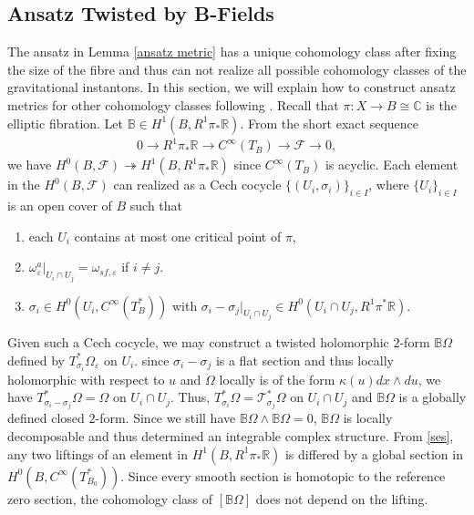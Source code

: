 \documentclass[11pt]{amsart}
\theoremstyle{plain}
\theoremstyle{definition}
\numberwithin{equation}{section}
\newcommand{\T}{\mathcal{T}}
\renewcommand{\epsilon}{\varepsilon}
\begin{document}
\subsection{Ansatz Twisted by B-Fields} \label{sec: B-field}
The ansatz in Lemma \ref{ansatz metric} has a unique cohomology class after fixing the size of the fibre and thus can not realize all possible cohomology classes of the gravitational instantons. In this section, we will explain how to construct ansatz metrics for other cohomology classes following \cite[Theorem 4.5]{GW}. Recall that $\pi:X\rightarrow B\cong \mathbb{C}$ is the elliptic fibration.  Let $\mathbb{B}\in H^1(B,R^1\pi_*\mathbb{R})$. From the short exact sequence 
  \begin{align} \label{ses}
  	 0\rightarrow R^1\pi_*\mathbb{R} \rightarrow  C^{\infty}(T_{B})\rightarrow  \mathcal{F}\rightarrow 0,
  \end{align} we have $H^0(B,\mathcal{F})\twoheadrightarrow H^1(B,R^1\pi_*\mathbb{R})$ since $C^{\infty}(T_{B})$ is acyclic. Each element in the $H^0(B,\mathcal{F})$ can realized as a Cech cocycle $\{(U_i,\sigma_i)\}_{i\in I}$, where $\{U_i\}_{i\in I} $ is an open cover of $B$ such that 
\begin{enumerate}
	\item each $U_i$ contains at most one critical point of $\pi$,
	\item $\omega^a_{\epsilon}|_{U_i\cap U_j}=\omega_{sf,\epsilon}$ if $i\neq j$.
	\item $\sigma_i\in H^0(U_i,C^{\infty}(T^*_B))$ with $\sigma_i-\sigma_j|_{U_i\cap U_j}\in H^0(U_i\cap U_j, R^1\pi^*\mathbb{R})$. 
\end{enumerate} 
Given such a Cech cocycle, we may construct a twisted holomorphic $2$-form $\mathbb{B}\Omega$ defined by $T_{\sigma_i}^*\Omega_{\epsilon}$ on $U_i$.
since $\sigma_i-\sigma_j$ is a flat section and thus locally holomorphic with respect to $u$ and $\Omega$ locally is of the form $\kappa(u)dx\wedge du$, we have $T_{\sigma_i-\sigma_j}^*\Omega=\Omega$ on $U_i\cap U_j$. Thus, $T_{\sigma_i}^*\Omega=\T_{\sigma_j}^*\Omega$ on $U_i\cap U_j$ and $\mathbb{B}\Omega$ is a globally defined closed $2$-form. Since we still have $\mathbb{B}\Omega\wedge \mathbb{B}\Omega=0$, $\mathbb{B}\Omega$ is locally decomposable and thus determined an integrable complex structure. From \eqref{ses}, any two liftings of an element in $H^1(B,R^1\pi_*\mathbb{R})$ is differed by a global section in $H^0(B,C^{\infty}(T_{B_0}^*))$. Since every smooth section is homotopic to the reference zero section, the cohomology class of $[\mathbb{B}\Omega]$ does not depend on the lifting. 
\end{document}
